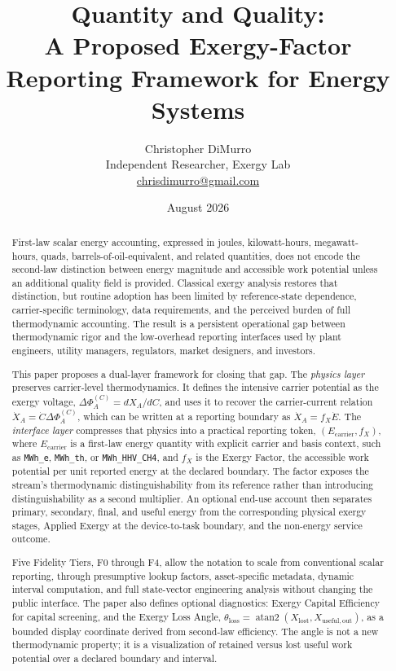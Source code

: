 \documentclass[11pt]{article}
\title{\textbf{Quantity and Quality:}\\[0.4em]\textbf{A Proposed Exergy-Factor Reporting Framework for Energy Systems}}
\author{Christopher DiMurro\\Independent Researcher, Exergy Lab\\\href{mailto:chrisdimurro@gmail.com}{chrisdimurro@gmail.com}}
\date{August 2026}
\begin{document}
\maketitle

\begin{abstract}
First-law scalar energy accounting, expressed in joules, kilowatt-hours, megawatt-hours, quads, barrels-of-oil-equivalent, and related quantities, does not encode the second-law distinction between energy magnitude and accessible work potential unless an additional quality field is provided. Classical exergy analysis restores that distinction, but routine adoption has been limited by reference-state dependence, carrier-specific terminology, data requirements, and the perceived burden of full thermodynamic accounting. The result is a persistent operational gap between thermodynamic rigor and the low-overhead reporting interfaces used by plant engineers, utility managers, regulators, market designers, and investors.

This paper proposes a dual-layer framework for closing that gap. The \textit{physics layer} preserves carrier-level thermodynamics. It defines the intensive carrier potential as the exergy voltage, $\Delta\Phi_A^{(C)} = dX_A/dC$, and uses it to recover the carrier-current relation $\dot{X}_A = \dot{C}\Delta\Phi_A^{(C)}$, which can be written at a reporting boundary as $\dot{X}_A=f_X\dot{E}$. The \textit{interface layer} compresses that physics into a practical reporting token, $(E_{\mathrm{carrier}}, f_X)$, where $E_{\mathrm{carrier}}$ is a first-law energy quantity with explicit carrier and basis context, such as \texttt{MWh\_e}, \texttt{MWh\_th}, or \texttt{MWh\_HHV\_CH4}, and $f_X$ is the Exergy Factor, the accessible work potential per unit reported energy at the declared boundary. The factor exposes the stream's thermodynamic distinguishability from its reference rather than introducing distinguishability as a second multiplier. An optional end-use account then separates primary, secondary, final, and useful energy from the corresponding physical exergy stages, Applied Exergy at the device-to-task boundary, and the non-energy service outcome.

Five Fidelity Tiers, F0 through F4, allow the notation to scale from conventional scalar reporting, through presumptive lookup factors, asset-specific metadata, dynamic interval computation, and full state-vector engineering analysis without changing the public interface. The paper also defines optional diagnostics: Exergy Capital Efficiency for capital screening, and the Exergy Loss Angle, $\theta_{\mathrm{loss}}=\operatorname{atan2}(X_{\mathrm{lost}},X_{\mathrm{useful,out}})$, as a bounded display coordinate derived from second-law efficiency. The angle is not a new thermodynamic property; it is a visualization of retained versus lost useful work potential over a declared boundary and interval.


\end{abstract}
\end{document}
